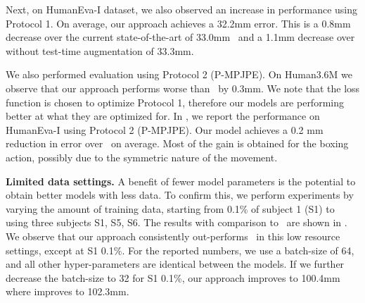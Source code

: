 \documentclass{article}
\begin{document}
Next, on HumanEva-I dataset, we also observed an increase in performance using Protocol 1.  On average, our approach achieves a 32.2mm error. This is a 0.8mm decrease over the current state-of-the-art of 33.0mm~\cite{pavllo20193d} and a 1.1mm decrease over~\cite{pavllo20193d} without test-time augmentation of 33.3mm.

We also performed evaluation using Protocol 2 (P-MPJPE). On Human3.6M we observe that our approach performs worse than~\citet{pavllo20193d} by 0.3mm. We note that the loss function is chosen to optimize Protocol 1, therefore our models are performing better at what they are optimized for. 
In , we
report the performance on HumanEva-I using Protocol 2 (P-MPJPE). Our model achieves a 0.2 mm reduction in error over~\citet{pavllo20193d} on average. Most of the gain is obtained for the boxing action, possibly due to the symmetric nature of the movement.

\textbf{Limited data settings.} A benefit of fewer model parameters is the potential to obtain better models with less  data. To confirm this, we perform experiments by varying the amount of training data, starting from  0.1\% of subject 1 (S1) to using three subjects S1, S5, S6. The results with comparison to~\cite{pavllo20193d} are shown in . We observe that our approach consistently out-performs~\cite{pavllo20193d} in this low resource settings, except at S1 0.1\%. 
For the reported numbers, we use a batch-size of 64, and all other hyper-parameters are identical between the models. 
If we further decrease the batch-size to 32 for S1 0.1\%, our approach improves to 100.4mm where \cite{pavllo20193d} improves to 102.3mm.
\end{document}
